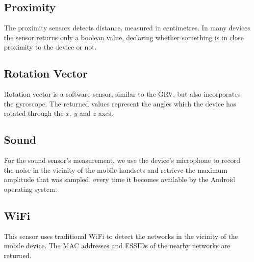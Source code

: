 \documentclass[runningheads,a4paper]{llncs}
\begin{document}
\subsection{Proximity}
The proximity sensors detects distance, measured in centimetres.
In many devices the sensor returns only a boolean value, declaring whether something is in close proximity to the device or not.


\subsection{Rotation Vector}
Rotation vector is a software sensor, similar to the GRV, but also incorporates the gyroscope. The returned values represent the angles which the device has rotated through the $x$, $y$ and $z$ axes.


\subsection{Sound}
For the sound sensor's measurement, we use the device's microphone to record the noise in the vicinity of the mobile handsets and retrieve the maximum amplitude that was sampled, every time it becomes available by the Android operating system.

\subsection{WiFi}
This sensor uses traditional WiFi to detect the networks in the vicinity of the mobile device.  The MAC addresses and ESSIDs of the nearby networks are returned.
 
\end{document}
